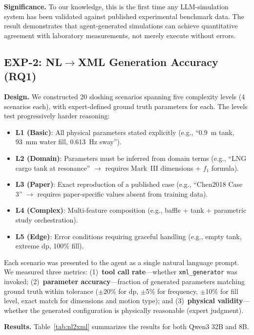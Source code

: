 \documentclass[11pt]{article}
\begin{document}
\textbf{Significance.} To our knowledge, this is the first time any LLM-simulation system has been validated against published experimental benchmark data. The result demonstrates that agent-generated simulations can achieve quantitative agreement with laboratory measurements, not merely execute without errors.

\subsection{EXP-2: NL$\rightarrow$XML Generation Accuracy (RQ1)}

\textbf{Design.} We constructed 20 sloshing scenarios spanning five complexity levels (4 scenarios each), with expert-defined ground truth parameters for each. The levels test progressively harder reasoning:

\begin{itemize}[noitemsep]
  \item \textbf{L1 (Basic)}: All physical parameters stated explicitly (e.g., ``0.9~m tank, 93~mm water fill, 0.613~Hz sway'').
  \item \textbf{L2 (Domain)}: Parameters must be inferred from domain terms (e.g., ``LNG cargo tank at resonance'' $\rightarrow$ requires Mark~III dimensions + $f_1$ formula).
  \item \textbf{L3 (Paper)}: Exact reproduction of a published case (e.g., ``Chen2018 Case 3'' $\rightarrow$ requires paper-specific values absent from training data).
  \item \textbf{L4 (Complex)}: Multi-feature composition (e.g., baffle + tank + parametric study orchestration).
  \item \textbf{L5 (Edge)}: Error conditions requiring graceful handling (e.g., empty tank, extreme dp, 100\% fill).
\end{itemize}

Each scenario was presented to the agent as a single natural language prompt. We measured three metrics: (1)~\textbf{tool call rate}---whether \texttt{xml\_generator} was invoked; (2)~\textbf{parameter accuracy}---fraction of generated parameters matching ground truth within tolerance ($\pm$20\% for dp, $\pm$5\% for frequency, $\pm$10\% for fill level, exact match for dimensions and motion type); and (3)~\textbf{physical validity}---whether the generated configuration is physically reasonable (expert judgment).

\textbf{Results.} Table~\ref{tab:nl2xml} summarizes the results for both Qwen3 32B and 8B.
\end{document}
